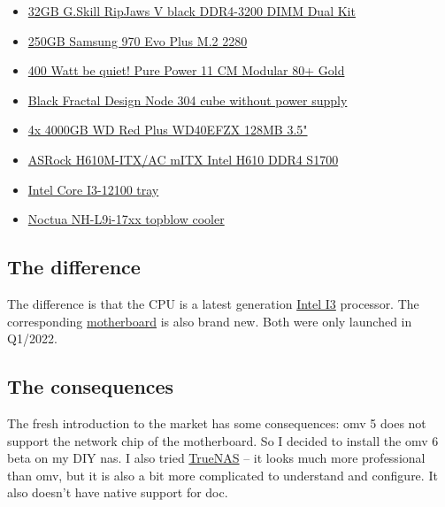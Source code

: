 \begin{itemize}
    \item \href{https://www.gskill.com/product/165/184/1536110922/F4-3200C16D-32GVK}{32GB G.Skill RipJaws V black DDR4-3200 DIMM Dual Kit}
    \item \href{https://www.samsung.com/de/memory-storage/nvme-ssd/970-evo-nvme-m-2-ssd-250gb-mz-v7e250bw/}{250GB Samsung 970 Evo Plus M.2 2280}
    \item \href{https://www.bequiet.com/de/powersupply/1539}{400 Watt be quiet! Pure Power 11 CM Modular 80+ Gold}
    \item \href{https://www.fractal-design.com/de/products/cases/node/node-304/black/}{Black Fractal Design Node 304 cube without power supply}
    \item \href{https://www.westerndigital.com/de-de/products/internal-drives/wd-red-plus-sata-3-5-hdd#WD40EFZX}{4x 4000GB WD Red Plus WD40EFZX 128MB 3.5"}
    \item \href{https://www.asrock.com/MB/Intel/H610M-ITXac/index.de.asp}{ASRock H610M-ITX/AC mITX Intel H610 DDR4 S1700}
    \item \href{https://ark.intel.com/content/www/us/en/ark/products/134584/intel-core-i312100-processor-12m-cache-up-to-4-30-ghz.html}{Intel Core I3-12100 tray}
    \item \href{https://noctua.at/en/nh-l9i-17xx}{Noctua NH-L9i-17xx topblow cooler}
\end{itemize}

\subsection{The difference}

The difference is that the CPU is a latest generation
\href{https://www.intel.com/content/www/us/en/products/sku/134584/intel-core-i312100-processor-12m-cache-up-to-4-30-ghz/specifications.html?wapkw=12100}{Intel I3}
processor. The corresponding
\href{https://www.asrock.com/MB/Intel/H610M-ITXac/index.de.asp}{motherboard}
is also brand new. Both were only launched in Q1/2022.

\subsection{The consequences}

The fresh introduction to the market has some consequences: \gls{omv} 5 does
not support the network chip of the motherboard. So I decided to install the
\gls{omv} 6 beta on my DIY \gls{nas}. I also tried
\href{https://www.truenas.com/}{TrueNAS} -- it looks much more professional
than \gls{omv}, but it is also a bit more complicated to understand and
configure. It also doesn't have native support for \gls{doc}.
